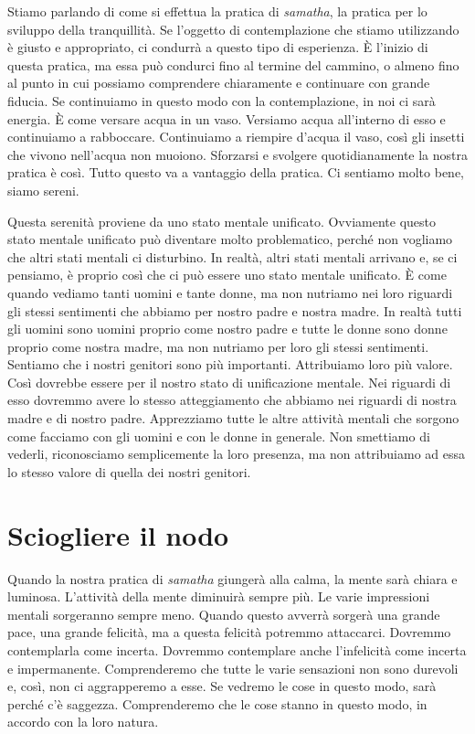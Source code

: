Stiamo parlando di come si effettua la pratica di \emph{samatha}, la
pratica per lo sviluppo della tranquillità. Se l'oggetto di
contemplazione che stiamo utilizzando è giusto e appropriato, ci
condurrà a questo tipo di esperienza. È l'inizio di questa pratica, ma
essa può condurci fino al termine del cammino, o almeno fino al punto in
cui possiamo comprendere chiaramente e continuare con grande fiducia. Se
continuiamo in questo modo con la contemplazione, in noi ci sarà
energia. È come versare acqua in un vaso. Versiamo acqua all'interno di
esso e continuiamo a rabboccare. Continuiamo a riempire d'acqua il vaso,
così gli insetti che vivono nell'acqua non muoiono. Sforzarsi e svolgere
quotidianamente la nostra pratica è così. Tutto questo va a vantaggio
della pratica. Ci sentiamo molto bene, siamo sereni.

Questa serenità proviene da uno stato mentale unificato. Ovviamente
questo stato mentale unificato può diventare molto problematico, perché
non vogliamo che altri stati mentali ci disturbino. In realtà, altri
stati mentali arrivano e, se ci pensiamo, è proprio così che ci può
essere uno stato mentale unificato. È come quando vediamo tanti uomini e
tante donne, ma non nutriamo nei loro riguardi gli stessi sentimenti che
abbiamo per nostro padre e nostra madre. In realtà tutti gli uomini sono
uomini proprio come nostro padre e tutte le donne sono donne proprio
come nostra madre, ma non nutriamo per loro gli stessi sentimenti.
Sentiamo che i nostri genitori sono più importanti. Attribuiamo loro più
valore. Così dovrebbe essere per il nostro stato di unificazione
mentale. Nei riguardi di esso dovremmo avere lo stesso atteggiamento che
abbiamo nei riguardi di nostra madre e di nostro padre. Apprezziamo
tutte le altre attività mentali che sorgono come facciamo con gli uomini
e con le donne in generale. Non smettiamo di vederli, riconosciamo
semplicemente la loro presenza, ma non attribuiamo ad essa lo stesso
valore di quella dei nostri genitori.

\section{Sciogliere il nodo}

Quando la nostra pratica di \emph{samatha} giungerà alla calma, la mente
sarà chiara e luminosa. L'attività della mente diminuirà sempre più. Le
varie impressioni mentali sorgeranno sempre meno. Quando questo avverrà
sorgerà una grande pace, una grande felicità, ma a questa felicità
potremmo attaccarci. Dovremmo contemplarla come incerta. Dovremmo
contemplare anche l'infelicità come incerta e impermanente.
Comprenderemo che tutte le varie sensazioni non sono durevoli e, così,
non ci aggrapperemo a esse. Se vedremo le cose in questo modo, sarà
perché c'è saggezza. Comprenderemo che le cose stanno in questo modo, in
accordo con la loro natura.

